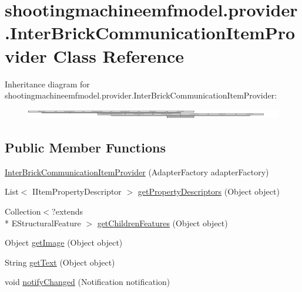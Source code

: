 \hypertarget{classshootingmachineemfmodel_1_1provider_1_1_inter_brick_communication_item_provider}{\section{shootingmachineemfmodel.\-provider.\-Inter\-Brick\-Communication\-Item\-Provider Class Reference}
\label{classshootingmachineemfmodel_1_1provider_1_1_inter_brick_communication_item_provider}
}
Inheritance diagram for shootingmachineemfmodel.\-provider.\-Inter\-Brick\-Communication\-Item\-Provider\-:\begin{figure}[H]
\begin{center}
\leavevmode
\includegraphics[height=0.431101cm]{classshootingmachineemfmodel_1_1provider_1_1_inter_brick_communication_item_provider}
\end{center}
\end{figure}
\subsection*{Public Member Functions}
\begin{DoxyCompactItemize}
\item 
\hyperlink{classshootingmachineemfmodel_1_1provider_1_1_inter_brick_communication_item_provider_a54c87fe4cf406cb18ee74ccd4b583543}{Inter\-Brick\-Communication\-Item\-Provider} (Adapter\-Factory adapter\-Factory)
\item 
List$<$ I\-Item\-Property\-Descriptor $>$ \hyperlink{classshootingmachineemfmodel_1_1provider_1_1_inter_brick_communication_item_provider_ab944c4f61888130234c7b7db8a1dd3b0}{get\-Property\-Descriptors} (Object object)
\item 
Collection$<$?extends \\*
E\-Structural\-Feature $>$ \hyperlink{classshootingmachineemfmodel_1_1provider_1_1_inter_brick_communication_item_provider_a901323773e29b616619607165634a5fd}{get\-Children\-Features} (Object object)
\item 
Object \hyperlink{classshootingmachineemfmodel_1_1provider_1_1_inter_brick_communication_item_provider_a177be22ca79664cff440ef568e5b8d38}{get\-Image} (Object object)
\item 
String \hyperlink{classshootingmachineemfmodel_1_1provider_1_1_inter_brick_communication_item_provider_a5670ccf2d577174322ebead081059eb2}{get\-Text} (Object object)
\item 
void \hyperlink{classshootingmachineemfmodel_1_1provider_1_1_inter_brick_communication_item_provider_a1f0fd44dc24c569083f0ab6d26972c76}{notify\-Changed} (Notification notification)
\end{DoxyCompactItemize}
